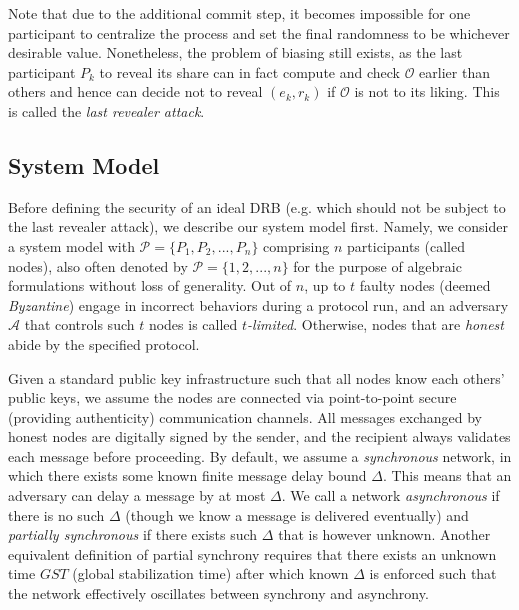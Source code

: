 \documentclass[letterpaper,twocolumn,10pt]{article}
\theoremstyle{definition}
\theoremstyle{remark}
\begin{document}
Note that due to the additional commit step, it becomes impossible for one participant to centralize the process and set the final randomness to be whichever desirable value. Nonetheless, the problem of biasing still exists, as the last participant $P_k$ to reveal its share can in fact compute and check $\mathcal{O}$ earlier than others and hence can decide not to reveal $(e_k, r_k)$ if $\mathcal{O}$ is not to its liking. This is called the \textit{last revealer attack}.

\subsection{System Model}
Before defining the security of an ideal DRB (e.g. which should not be subject to the last revealer attack), we describe our system model first. Namely, we consider a system model with $\mathcal{P} = \{P_1, P_2, ..., P_n\}$ comprising $n$ participants (called nodes), also often denoted by $\mathcal{P} = \{1, 2, ..., n\}$ for the purpose of algebraic formulations without loss of generality. Out of $n$, up to $t$ faulty nodes (deemed \textit{Byzantine}) engage in incorrect behaviors during a protocol run, and an adversary $\mathcal{A}$ that controls such $t$ nodes is called \textit{$t$-limited}. Otherwise, nodes that are \textit{honest} abide by the specified protocol.

Given a standard public key infrastructure such that all nodes know each others' public keys, we assume the nodes are connected via point-to-point secure (providing authenticity) communication channels. All messages exchanged by honest nodes are digitally signed by the sender, and the recipient always validates each message before proceeding. By default, we assume a \textit{synchronous} network, in which there exists some known finite message delay bound $\Delta$. This means that an adversary can delay a message by at most $\Delta$. We call a network \textit{asynchronous} if there is no such $\Delta$ (though we know a message is delivered eventually) and \textit{partially synchronous} if there exists such $\Delta$ that is however unknown. Another equivalent definition of partial synchrony \cite{dwork1988consensus} requires that there exists an unknown time $GST$ (global stabilization time) after which known $\Delta$ is enforced such that the network effectively oscillates between synchrony and asynchrony.
\end{document}
